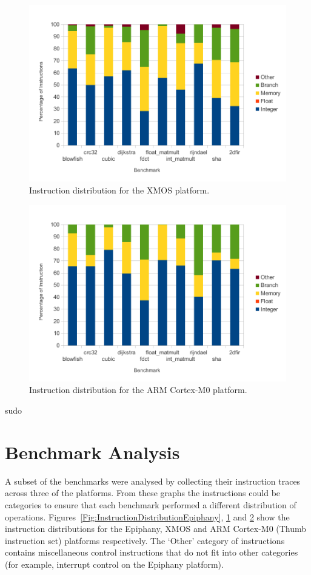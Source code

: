 \documentclass[twocolumn]{article}
\newcommand{\nsection}[1]{\section{\bfseries #1}}
\begin{document}
\begin{figure}[t]
	\includegraphics[width=\linewidth]{xmos.pdf}
	\caption{Instruction distribution for the XMOS platform.}
	\label{Fig:InstructionDistributionXMOS}
\end{figure}

\begin{figure}[t]
	\includegraphics[width=\linewidth]{arm.pdf}
	\caption{Instruction distribution for the ARM Cortex-M0 platform.}
	\label{Fig:InstructionDistributionARM}
\end{figure}
sudo

\nsection{Benchmark Analysis}

A subset of the benchmarks were analysed by collecting their instruction traces across three of the platforms. From these graphs the instructions could be categories to ensure that each benchmark performed a different distribution of operations. Figures~\ref{Fig:InstructionDistributionEpiphany}, \ref{Fig:InstructionDistributionXMOS} and \ref{Fig:InstructionDistributionARM} show the instruction distributions for the Epiphany, XMOS and ARM Cortex-M0 (Thumb instruction set) platforms respectively. The `Other' category of instructions contains miscellaneous control instructions that do not fit into other categories (for example, interrupt control on the Epiphany platform).
\end{document}
